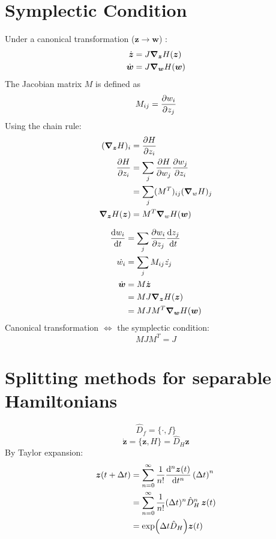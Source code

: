 \documentclass{article}
\renewcommand{\vec}[1]{\boldsymbol{#1}}
\begin{document}
\section{Symplectic Condition}

Under a canonical transformation ($\vec{z} \to \vec{w}$) :
\begin{align*}
	\dot{\vec{z}} &= J \grad_{\vec{z}}{H(\vec{z})} \\
	\dot{\vec{w}} &= J \grad_{\vec{w}}{H(\vec{w})}
\end{align*}
The Jacobian matrix $M$ is defined as
\[ M_{ij} = \pdv{w_i}{z_j} \]
Using the chain rule:
\begin{align*}
	(\grad_{\vec{z}}{H})_i &= \pdv{H}{z_i}\\
	\pdv{H}{z_i} &= \sum_j \pdv{H}{w_j} \pdv{w_j}{z_i} \\
	&= \sum_j (M^T)_{ij} (\grad_w H)_j \\
	\grad_{\vec{z}}{H(\vec{z})} &= M^T \grad_w{H(\vec{w})}
\end{align*}

\begin{align*}
	\dv{w_i}{t} &= \sum_j \pdv{w_i}{z_j} \dv{z_j}{t} \\
	\dot{w_i} &= \sum_j M_{ij} \dot{z_j} \\
	\dot{\vec{w}} &= M \dot{\vec{z}} \\
	&= M J \grad_{\vec{z}}{H(\vec{z})} \\
	&= M J M^T \grad_{\vec{w}}{H(\vec{w})}
\end{align*}
Canonical transformation $\iff$ the symplectic condition:
\[ M J M^T = J \]

\section{Splitting methods for separable Hamiltonians}
\[ \hat{D}_f = \{ \cdot , f \} \]
\begin{equation} \label{eq:Hamilton_eq_simplified}
	\dot{\vec{z}} = \{ \vec{z}, H \} = \hat{D}_H \vec{z}
\end{equation}
By Taylor expansion:
\begin{align*}
	\vec{z}(t+\Delta t) &= \sum_{n=0}^{\infty} \frac{1}{n!} \dv[n]{\vec{z}(t)}{t} \left( \Delta t \right)^n \\
	&= \sum_{n=0}^{\infty} \frac{1}{n!}(\Delta t)^n \hat{D}_H^n \, \vec{z}(t) \\
	&= \exp(\Delta t \hat{D}_H) \vec{z}(t)
\end{align*}
\end{document}
